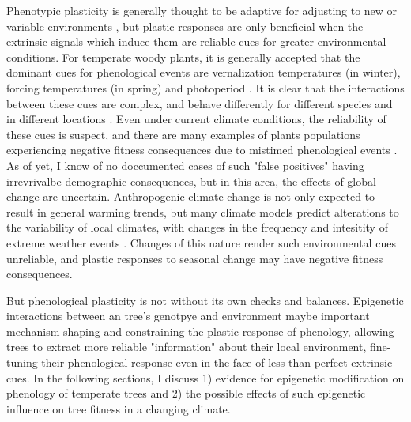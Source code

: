 \documentclass{article}\usepackage[]{graphicx}\usepackage[]{color}
\begin{document}
\par  Phenotypic plasticity is generally thought to be adaptive for adjusting to new or variable environments \citep{}, but plastic responses are only beneficial when the extrinsic signals which induce them are reliable cues for greater environmental conditions. For temperate woody plants, it is generally accepted that the dominant cues for phenological events are vernalization temperatures (in winter), forcing temperatures (in spring) and photoperiod \citep{}. It is clear that the interactions between these cues are complex, and behave differently for different species and in different locations \citep{}. Even under current climate conditions, the reliability of these cues is suspect, and there are many examples of plants populations experiencing negative fitness consequences due to mistimed phenological events \cite{Inouye2008}. As of yet, I know of no doccumented cases of such "false positives" having irrevrivalbe demographic consequences, but in this area, the effects of global change are uncertain. Anthropogenic climate change is not only expected to result in general warming trends, but many climate models predict alterations to the variability of local climates, with changes in the frequency and intesitity of extreme weather events \citep{}. Changes of this nature render such environmental cues unreliable, and plastic responses to seasonal change may have negative fitness consequences.
\par But phenological plasticity is not without its own checks and balances. Epigenetic interactions between an tree's genotpye and environment maybe important mechanism shaping and constraining the plastic response of phenology, allowing trees to extract more reliable "information" about their local environment, fine-tuning their phenological response even in the face of less than perfect extrinsic cues. In the following sections, I discuss 1) evidence for epigenetic modification on phenology of temperate trees and 2) the possible effects of such epigenetic influence on tree fitness in a changing climate.
\end{document}
